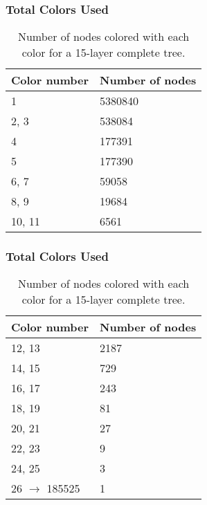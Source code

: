 \begin{frame}
    \frametitle{Total Colors Used}

\begin{table}[h]
    \centering
    \begin{tabular}{|l|l|}
        \hline
        \textbf{Color number} & \textbf{Number of nodes} \\ \hline
        1                      & 5380840                   \\ \hline
        2, 3                      & 538084                    \\ \hline
        4                      & 177391                    \\ \hline
        5                      & 177390                    \\ \hline
        6, 7                   & 59058                     \\ \hline
        8, 9                   & 19684                     \\ \hline
        10, 11                 & 6561                      \\ \hline
    \end{tabular}
    \caption{Number of nodes colored with each color for a 15-layer complete tree.}
    \label{tab:colors}
    \end{table}
\end{frame}


\begin{frame}
    \frametitle{Total Colors Used}
    \begin{table}[h]
        \centering
        \begin{tabular}{|l|l|}
            \hline
            \textbf{Color number} & \textbf{Number of nodes} \\ \hline
            12, 13                 & 2187                      \\ \hline
            14, 15                 & 729                       \\ \hline
            16, 17                 & 243                       \\ \hline
            18, 19                 & 81                        \\ \hline
            20, 21                 & 27                        \\ \hline
            22, 23                 & 9                         \\ \hline
            24, 25                 & 3                         \\ \hline
            26 $\to$ 185525  & 1\\ \hline
        \end{tabular}
        \caption{Number of nodes colored with each color for a 15-layer complete tree.}
        \label{tab:colors}
    \end{table}
\end{frame}


